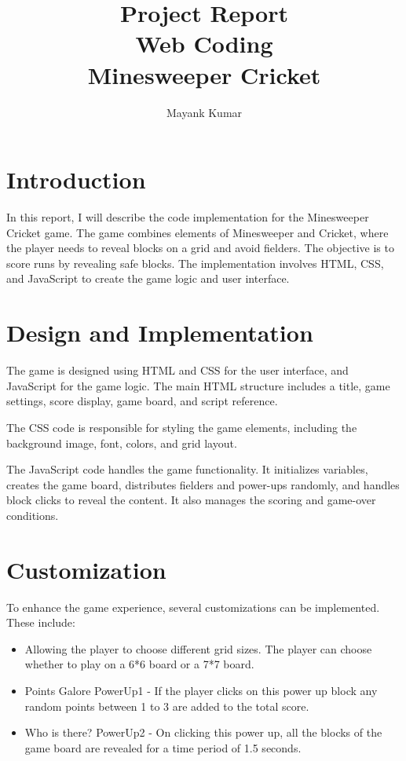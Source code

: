 \documentclass{article}
\title{Project Report \\ Web Coding
         \\ Minesweeper Cricket}
\author{Mayank Kumar}
\begin{document}
\maketitle

\tableofcontents
\clearpage
\section{Introduction}
In this report, I will describe the code implementation for the Minesweeper Cricket game. The game combines elements of Minesweeper and Cricket, where the player needs to reveal blocks on a grid and avoid fielders. The objective is to score runs by revealing safe blocks. The implementation involves HTML, CSS, and JavaScript to create the game logic and user interface.

\section{Design and Implementation}
The game is designed using HTML and CSS for the user interface, and JavaScript for the game logic. The main HTML structure includes a title, game settings, score display, game board, and script reference.


The CSS code is responsible for styling the game elements, including the background image, font, colors, and grid layout.


The JavaScript code handles the game functionality. It initializes variables, creates the game board, distributes fielders and power-ups randomly, and handles block clicks to reveal the content. It also manages the scoring and game-over conditions.

\section{Customization}
To enhance the game experience, several customizations can be implemented. These include:
\begin{itemize}
  \item Allowing the player to choose different grid sizes. The player can choose whether to play on a 6*6 board or a 7*7 board.
  \item Points Galore {PowerUp1} - If the player clicks on this power up block any random points between 1 to 3 are added to the total score.
  \item Who is there? {PowerUp2} - On clicking this power up, all the blocks of the game board are revealed for a time period of 1.5 seconds.
\end{itemize}
\end{document}
